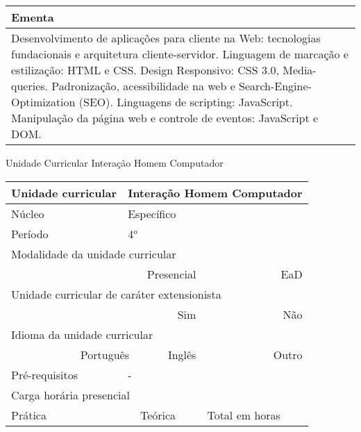 \begin{quadro}[ht!]
\begin{tabular}{|p{3cm} p{2cm} p{3cm} p{2cm} p{3cm} p{2cm}|}
\multicolumn{6}{|p{15cm}|}{\cellcolor{blue1} Ementa} \\\hline
\hline\multicolumn{6}{|p{15cm}|}{\scriptsize Desenvolvimento de aplicações para cliente na Web: tecnologias fundacionais e arquitetura cliente-servidor. Linguagem de marcação e estilização: HTML e CSS. Design Responsivo: CSS 3.0, Media-queries. Padronização, acessibilidade na web e Search-Engine-Optimization (SEO). Linguagens de scripting: JavaScript. Manipulação da página web e controle de eventos: JavaScript e DOM.}\\\hline
\hline
	\end{tabular}
\end{quadro}
\begin{quadro}[ht!]
  \centering\scriptsize
\caption{Unidade Curricular Interação Homem Computador}
\label{ unit_21 }
\begin{tabular}{|p{3cm} p{2cm} p{3cm} p{2cm} p{3cm} p{2cm}|}\hline
\multicolumn{1}{|p{3cm}|}{\cellcolor{blue1} Unidade curricular} & \multicolumn{5}{p{9cm}|}{ Interação Homem Computador }\\\hline
\multicolumn{1}{|p{3cm}|}{\cellcolor{blue1} Núcleo} & \multicolumn{5}{p{11.5cm}|}{ Específico }\\\hline
\multicolumn{1}{|p{3cm}|}{\cellcolor{blue1} Período} & \multicolumn{5}{p{9cm}|}{ 4$^o$ }\\\hline
\multicolumn{6}{|p{15cm}|}{\cellcolor{blue1} Modalidade da unidade curricular} \\\hline
\multicolumn{2}{|r}{		} &  \multicolumn{2}{r}{Presencial \XBox } & \multicolumn{2}{r|}{EaD \Square	} \\\hline
\multicolumn{6}{|p{15cm}|}{\cellcolor{blue1} Unidade curricular de caráter extensionista} \\\hline
\multicolumn{4}{|r}{			Sim \Square	} & \multicolumn{2}{r|}{	Não \XBox	}\\\hline
\multicolumn{6}{|p{15cm}|}{\cellcolor{blue1} Idioma da unidade curricular} \\ \hline
\multicolumn{2}{|r}{	Português \XBox	} &  \multicolumn{2}{r}{	Inglês \Square	} & \multicolumn{2}{r|}{	Outro \Square	} \\ \hline
\multicolumn{1}{|p{3cm}|}{\cellcolor{blue1} Pré-requisitos} & \multicolumn{5}{p{9cm}|}{ - }\\ \hline
\multicolumn{6}{|p{15cm}|}{\cellcolor{blue1} Carga horária presencial} \\ \hline
\multicolumn{1}{|p{3cm}|}{\raggedleft Prática} & \multicolumn{1}{p{1cm}|}{\centering	15	} &  \multicolumn{1}{p{3cm}|}{\raggedleft Teórica}  & \multicolumn{1}{p{1cm}|}{\centering 	15 } & \multicolumn{1}{p{3cm}|}{\raggedleft Total em horas} & \multicolumn{1}{p{1cm}|}{\raggedleft	30	} \\ \hline

\end{tabular}
\end{quadro}
